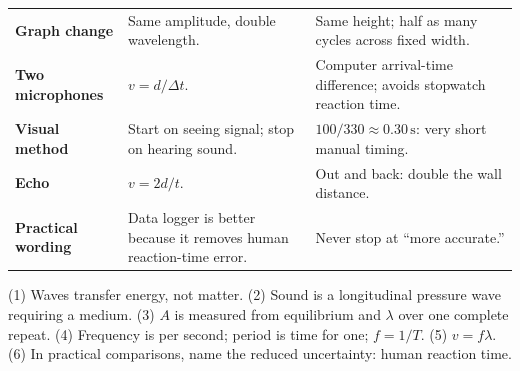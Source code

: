\documentclass[11pt,a4paper]{article}
\begin{document}
\begin{tabular}{>{\bfseries}p{3.0cm}p{8.1cm}p{3.5cm}}
Graph change & Same amplitude, double wavelength. & Same height; half as many cycles across fixed width. \\
Two microphones & $v=d/\Delta t$. & Computer arrival-time difference; avoids stopwatch reaction time. \\
Visual method & Start on seeing signal; stop on hearing sound. & $100/330\approx0.30\,\mathrm{s}$: very short manual timing. \\
Echo & $v=2d/t$. & Out and back: double the wall distance. \\
Practical wording & Data logger is better because it removes human reaction-time error. & Never stop at ``more accurate.'' \\ \bottomrule
\end{tabular}

\vfill
\begin{keybox}[title=\textbf{If you remember only six things}]
(1) Waves transfer energy, not matter. \quad
(2) Sound is a longitudinal pressure wave requiring a medium. \quad
(3) $A$ is measured from equilibrium and $\lambda$ over one complete repeat. \quad
(4) Frequency is per second; period is time for one; $f=1/T$. \quad
(5) $v=f\lambda$. \quad
(6) In practical comparisons, name the reduced uncertainty: human reaction time.
\end{keybox}
\end{document}
